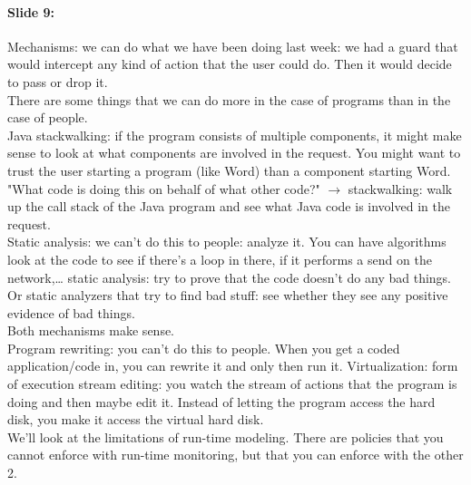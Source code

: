 \documentclass[10pt,a4paper]{report}
\begin{document}
\paragraph{Slide 9:} Mechanisms: we can do what we have been doing last week: we had a guard that would intercept any kind of action that the user could do. Then it would decide to pass or drop it. \\
There are some things that we can do more in the case of programs than in the case of people. \\
Java stackwalking: if the program consists of multiple components, it might make sense to look at what components are involved in the request. You might want to trust the user starting a program (like Word) than a component starting Word. "What code is doing this on behalf of what other code?" $\rightarrow$ stackwalking: walk up the call stack of the Java program and see what Java code is involved in the request.\\ 
Static analysis: we can't do this to people: analyze it. You can have algorithms look at the code to see if there's a loop in there, if it performs a send on the network,… static analysis: try to prove that the code doesn't do any bad things. Or static analyzers that try to find bad stuff: see whether they see any positive evidence of bad things.\\
Both mechanisms make sense.\\
Program rewriting: you can't do this to people. When you get a coded application/code in, you can rewrite it and only then run it. Virtualization: form of execution stream editing: you watch the stream of actions that the program is doing and then maybe edit it. Instead of letting the program access the hard disk, you make it access the virtual hard disk.\\
We'll look at the limitations of run-time modeling. There are policies that you cannot enforce with run-time monitoring, but that you can enforce with the other 2.
\end{document}
